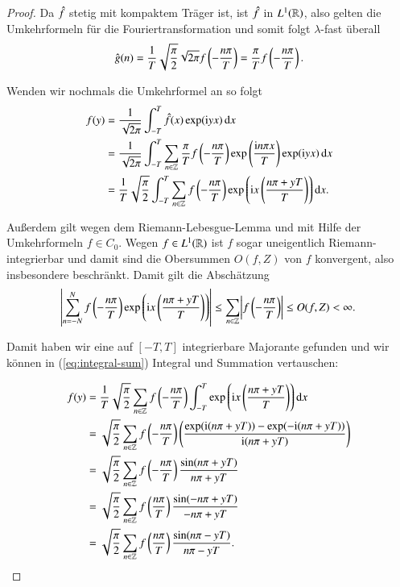 \begin{proof}
  Da $\hat{f}$ stetig mit kompaktem Träger ist, ist $\hat{f}$ in $L^1(\mathbb{R})$, also gelten die Umkehrformeln für die Fouriertransformation und somit folgt $\lambda$-fast überall
  \begin{equation*}
    \hat{g}(n)=\frac{1}{T}\sqrt{\frac{\pi}{2}} \sqrt{2 \pi} f \left( -\frac{n\pi}{T} \right)
    = \frac{\pi}{T} f \left( -\frac{n\pi}{T} \right).
  \end{equation*}

  Wenden wir nochmals die Umkehrformel an so folgt
  \begin{equation}
    \label{eq:integral-sum}
    \begin{split}
      f(y)
      &= \frac{1}{\sqrt{2\pi}} \int_{-T}^T{\fouriertransform{f}(x) \exp(\i yx) \dif x} \\
      &= \frac{1}{\sqrt{2\pi}} \int_{-T}^T{\sum_{n \in \Z}{\frac{\pi}{T} f\left( -\frac{n\pi}{T} \right) \exp \left( \frac{\i n\pi x}{T} \right)} \exp(\i yx)\dif x} \\
      &= \frac{1}{T} \sqrt{\frac{\pi}{2}} \int_{-T}^T{ \sum_{n \in \Z} {f \left( -\frac{n\pi}{T} \right) \exp \left( \i x \left( \frac{n\pi + yT}{T} \right) \right)} \dif x}.
    \end{split}
  \end{equation}

  Außerdem gilt wegen dem Riemann-Lebesgue-Lemma und mit Hilfe der Umkehrformeln $f \in C_0$.
  Wegen $f \in L^1(\mathbb{R})$ ist $f$ sogar uneigentlich Riemann-integrierbar und damit sind die Obersummen $O(f,Z)$ von $f$ konvergent, also insbesondere beschränkt.
  Damit gilt die Abschätzung
  \begin{equation*}
    \abs{\sum_{n=-N}^N{f \left(- \frac{n\pi}{T} \right) \exp \left( \mathrm{i} x \left( \frac{n\pi + yT}{T} \right) \right)}}
    \leq \sum_{n \in \mathbb{Z}}{\abs{f \left( -\frac{n\pi}{T} \right)}}
    \leq O(f,Z)
    < \infty.
  \end{equation*}

  Damit haben wir eine auf $[-T,T]$ integrierbare Majorante gefunden und wir können in (\ref{eq:integral-sum}) Integral und Summation vertauschen:

  \begin{equation*}
    \begin{split}
      f(y)
      &= \frac{1}{T} \sqrt{\frac{\pi}{2}} \sum_{n \in \Z}{f \left(-\frac{n\pi}{T}\right) \int_{-T}^T{\exp \left(\i x \left( \frac{n\pi + yT}{T} \right) \right) \dif x}} \\
      &= \sqrt{\frac{\pi}{2}}\sum_{n \in \Z}{f \left(-\frac{n\pi}{T} \right) \left(\frac{\exp(\i(n\pi + yT)) - \exp(-\i(n\pi + yT))}{\i(n\pi + yT)} \right)} \\
      &= \sqrt{\frac{\pi}{2}} \sum_{n \in \Z}{f \left(-\frac{n\pi}{T}\right)\frac{\sin(n\pi + yT)}{n\pi + yT}} \\
      &= \sqrt{\frac{\pi}{2}} \sum_{n \in \Z}{f \left(\frac{n\pi}{T} \right) \frac{\sin(-n\pi + yT)}{-n\pi + yT}} \\
      &= \sqrt{\frac{\pi}{2}} \sum_{n \in \Z}{f \left(\frac{n\pi}{T} \right) \frac{\sin(n\pi - yT)}{n\pi - yT}}.
    \end{split}
  \end{equation*}
\end{proof}
